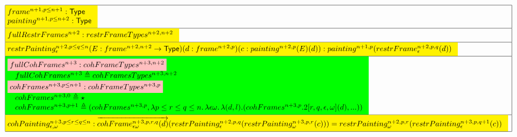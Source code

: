 \documentclass[a4paper,english,cleveref,autoref,thm-restate]{article}
\newcommand{\Type}{\mathsf{Type}}
\newcommand{\defeq}{\triangleq}
\begin{document}
\begin{tiny}
{$
  \begin{array}{|l|}
    \hline
    \!\!\!\colorbox{yellow}{$
      \!\!\!
      \begin{array}{l}
        frame^{n+1,p\leq n+1}:\Type\\
        painting^{n+1,p\leq n+2}:\Type\\
      \end{array}
    $}\\
    \hline
    \!\!\!\colorbox{yellow}{$
      \!\!\!
      \begin{array}[t]{l}
        fullRestrFrames^{n+2}:restrFrameTypes^{n+2,n+2}\\
      \end{array}
    $}\\
    \hline
    \!\!\!\colorbox{yellow}{$
      \!\!\!
      \begin{array}{l}
        restrPainting^{n+2,p\leq q \leq n}_\epsilon(E:frame^{n+2,n+2}\rightarrow \Type)(d:frame^{n+2,p})(c:painting^{n+2,p}(E)(d)): painting^{n+1,p}(restrFrame^{n+2,p,q}_{\epsilon}(d))\\
      \end{array}
    $}\!\!\!\\
    \hline
    \!\!\!\colorbox{green}{$
      \!\!\!
      \begin{array}{l}
        \colorbox{pink}{$fullCohFrames^{n+3}:cohFrameTypes^{n+3,n+2}$}\\
        \quad fullCohFrames^{n+3}\defeq cohFramesTypes^{n+3,n+2} \\
        \colorbox{pink}{$cohFrames^{n+3,p\leq n+1}:cohFrameTypes^{n+3,p}$}\\
        \quad cohFrames^{n+3,0}\defeq \star\\
        \quad cohFrames^{n+3,p+1}\defeq (cohFrames^{n+3,p},\lambda p \leq r \leq q \leq n.\, \lambda \epsilon \omega.\, \lambda(d,l).(cohFrames^{n+3,p}.2[r,q,\epsilon,\omega](d),...))
      \end{array}
    $}\\
    \hline
    \!\!\!\colorbox{yellow}{$
      \!\!\!
      \begin{array}{l}
        cohPainting_{\epsilon,\omega}^{n+3,p\leq r\leq q\leq n}: \overrightarrow{cohFrame^{n+3,p,r,q}_{\epsilon\omega}(d)}(restrPainting^{n+2,p,q}_{\epsilon}(restrPainting^{n+3,p,r}_{\omega}(c))) = restrPainting^{n+2,p,r}_{\omega}(restrPainting^{n+3,p,q+1}_{\epsilon}(c))\\
      \end{array}
    $}\\
    \hline
  \end{array}
$
}
\end{tiny}
\end{document}
